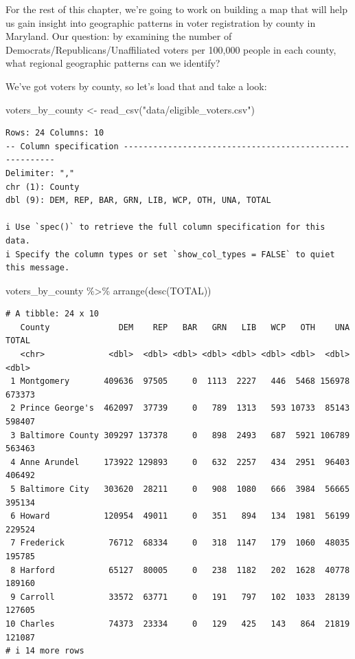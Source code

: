 \documentclass[
  letterpaper,
  DIV=11,
  numbers=noendperiod]{scrreprt}
\newenvironment{Shaded}{\begin{snugshade}}{\end{snugshade}}
\newcommand{\FunctionTok}[1]{\textcolor[rgb]{0.28,0.35,0.67}{#1}}
\newcommand{\NormalTok}[1]{\textcolor[rgb]{0.00,0.23,0.31}{#1}}
\newcommand{\OtherTok}[1]{\textcolor[rgb]{0.00,0.23,0.31}{#1}}
\newcommand{\SpecialCharTok}[1]{\textcolor[rgb]{0.37,0.37,0.37}{#1}}
\newcommand{\StringTok}[1]{\textcolor[rgb]{0.13,0.47,0.30}{#1}}
\begin{document}
For the rest of this chapter, we're going to work on building a map that
will help us gain insight into geographic patterns in voter registration
by county in Maryland. Our question: by examining the number of
Democrats/Republicans/Unaffiliated voters per 100,000 people in each
county, what regional geographic patterns can we identify?

We've got voters by county, so let's load that and take a look:

\begin{Shaded}
\begin{Highlighting}[]
\NormalTok{voters\_by\_county }\OtherTok{\textless{}{-}} \FunctionTok{read\_csv}\NormalTok{(}\StringTok{"data/eligible\_voters.csv"}\NormalTok{)}
\end{Highlighting}
\end{Shaded}

\begin{verbatim}
Rows: 24 Columns: 10
-- Column specification --------------------------------------------------------
Delimiter: ","
chr (1): County
dbl (9): DEM, REP, BAR, GRN, LIB, WCP, OTH, UNA, TOTAL

i Use `spec()` to retrieve the full column specification for this data.
i Specify the column types or set `show_col_types = FALSE` to quiet this message.
\end{verbatim}

\begin{Shaded}
\begin{Highlighting}[]
\NormalTok{voters\_by\_county }\SpecialCharTok{\%\textgreater{}\%} \FunctionTok{arrange}\NormalTok{(}\FunctionTok{desc}\NormalTok{(TOTAL))}
\end{Highlighting}
\end{Shaded}

\begin{verbatim}
# A tibble: 24 x 10
   County              DEM    REP   BAR   GRN   LIB   WCP   OTH    UNA  TOTAL
   <chr>             <dbl>  <dbl> <dbl> <dbl> <dbl> <dbl> <dbl>  <dbl>  <dbl>
 1 Montgomery       409636  97505     0  1113  2227   446  5468 156978 673373
 2 Prince George's  462097  37739     0   789  1313   593 10733  85143 598407
 3 Baltimore County 309297 137378     0   898  2493   687  5921 106789 563463
 4 Anne Arundel     173922 129893     0   632  2257   434  2951  96403 406492
 5 Baltimore City   303620  28211     0   908  1080   666  3984  56665 395134
 6 Howard           120954  49011     0   351   894   134  1981  56199 229524
 7 Frederick         76712  68334     0   318  1147   179  1060  48035 195785
 8 Harford           65127  80005     0   238  1182   202  1628  40778 189160
 9 Carroll           33572  63771     0   191   797   102  1033  28139 127605
10 Charles           74373  23334     0   129   425   143   864  21819 121087
# i 14 more rows
\end{verbatim}
\end{document}
